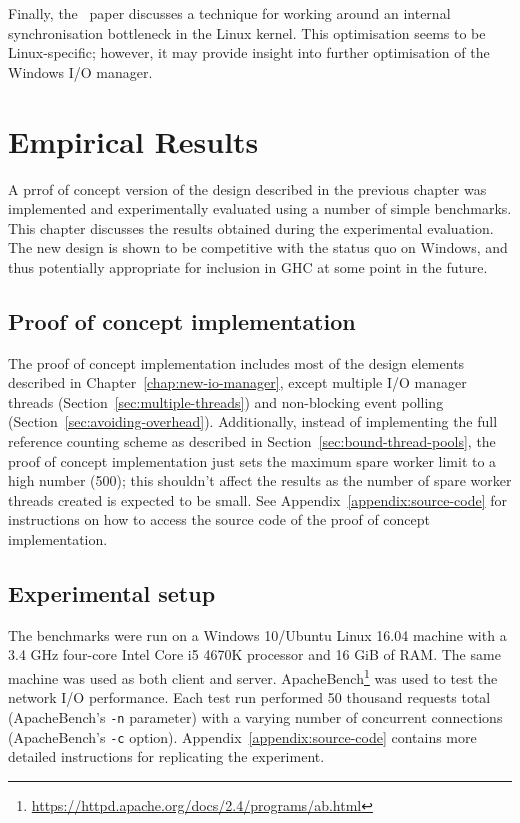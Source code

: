 \documentclass[a4paper,11pt,oneside]{report}
\begin{document}
Finally, the~\cite{bib:voellmy} paper discusses a technique for working around
an internal synchronisation bottleneck in the Linux kernel. This optimisation
seems to be Linux-specific; however, it may provide insight into further
optimisation of the Windows I/O manager.

\chapter{Empirical Results}
\label{chap:evaluation}

A prrof of concept version of the design described in the previous chapter was
implemented and experimentally evaluated using a number of simple
benchmarks. This chapter discusses the results obtained during the experimental
evaluation. The new design is shown to be competitive with the status quo on
Windows, and thus potentially appropriate for inclusion in GHC at some point in
the future.

\section{Proof of concept implementation}
\label{sec:proof-of-concept}

The proof of concept implementation includes most of the design elements
described in Chapter~\ref{chap:new-io-manager}, except multiple I/O manager
threads (Section~\ref{sec:multiple-threads}) and non-blocking event polling
(Section~\ref{sec:avoiding-overhead}). Additionally, instead of implementing the
full reference counting scheme as described in
Section~\ref{sec:bound-thread-pools}, the proof of concept implementation just
sets the maximum spare worker limit to a high number (500); this shouldn't
affect the results as the number of spare worker threads created is expected to
be small. See Appendix~\ref{appendix:source-code} for instructions on how to
access the source code of the proof of concept implementation.

\section{Experimental setup}

The benchmarks were run on a Windows 10/Ubuntu Linux 16.04 machine with a 3.4
GHz four-core Intel Core i5 4670K processor and 16 GiB of RAM. The same machine
was used as both client and
server. ApacheBench\footnote{\url{https://httpd.apache.org/docs/2.4/programs/ab.html}}
was used to test the network I/O performance. Each test run performed 50
thousand requests total (ApacheBench's \texttt{-n} parameter) with a varying
number of concurrent connections (ApacheBench's \texttt{-c}
option). Appendix~\ref{appendix:source-code} contains more detailed instructions
for replicating the experiment.
\end{document}
